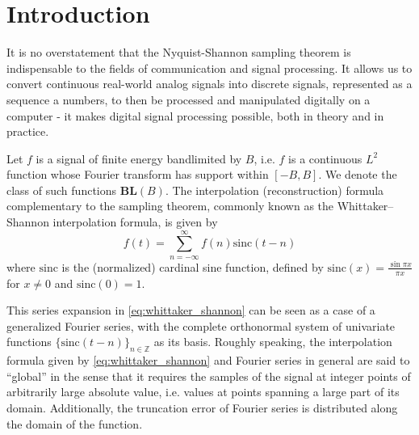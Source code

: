 \documentclass[11pt]{article} %
\theoremstyle{plain}
\theoremstyle{definition}
\theoremstyle{remark}
\begin{document}

\tableofcontents %

\newpage %


\section{Introduction} %

It is no overstatement that the Nyquist-Shannon sampling theorem
 is indispensable to the fields of communication and signal processing. It 
allows us to convert continuous real-world analog signals into discrete signals, 
represented as a sequence a numbers, to then be processed and manipulated digitally on a 
computer - it makes digital signal processing possible, both in theory and in practice.

Let $f$ is a signal of finite energy bandlimited by $B$, i.e. $f$ is a continuous $L^2$ 
function whose Fourier transform has support within $[-B,B]$. We denote the class of
such functions $\mathbf{BL}(B)$. The interpolation (reconstruction) formula complementary to the 
sampling theorem, commonly known as the Whittaker–Shannon interpolation formula, is
given by
\begin{equation} \label{eq:whittaker_shannon}
  f(t) = \sum_{n=-\infty}^{\infty} f(n) \mathrm{sinc}(t-n)
\end{equation}
where $\mathrm{sinc}$ is the (normalized) cardinal sine function, defined by 
$\mathrm{sinc}(x)=\frac{\sin{\pi x}}{\pi x}$ for $x \neq 0$ and $\mathrm{sinc}(0)=1$.

This series expansion in \cref{eq:whittaker_shannon} can be seen as a case of a 
generalized Fourier series, with the complete orthonormal system of univariate functions 
$\{ \mathrm{sinc}(t-n) \}_{n\in\mathbb{Z}}$ as its basis. Roughly speaking, the interpolation
formula given by \cref{eq:whittaker_shannon} and Fourier series in general are said to
``global'' in the sense that it requires the samples of the signal at integer points of 
 arbitrarily large absolute value, i.e. values at 
points spanning a large part of its domain. Additionally, the truncation error of Fourier 
series is  distributed along the domain of the function.
\end{document}
